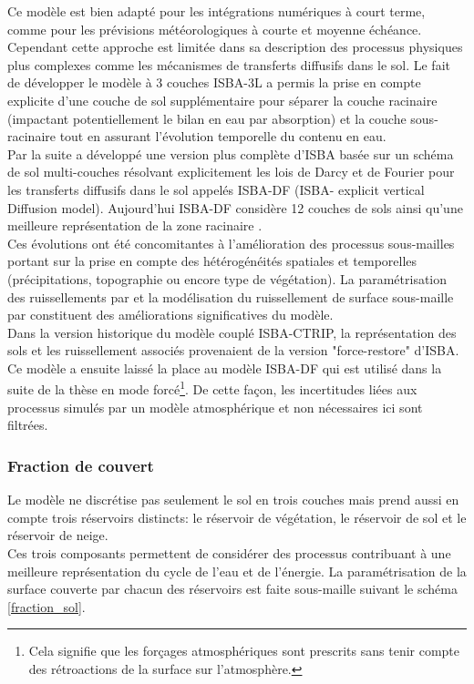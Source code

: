 Ce modèle est bien adapté pour les intégrations numériques à court terme, comme pour les prévisions météorologiques à courte et moyenne échéance. \noindent
Cependant cette approche est limitée dans sa description des processus physiques plus complexes comme les mécanismes de transferts diffusifs dans le sol. Le fait de développer le modèle à 3 couches ISBA-3L a permis la prise en compte explicite d'une couche de sol supplémentaire pour séparer la couche racinaire (impactant potentiellement le bilan en eau par absorption) et la couche sous-racinaire \citep{boone1999} tout en assurant l'évolution temporelle du contenu en eau.\\

Par la suite \citet{boone2000} a développé une version plus complète d'ISBA basée sur un schéma de sol multi-couches résolvant explicitement les lois de Darcy et de Fourier pour les transferts diffusifs dans le sol appelés ISBA-DF (ISBA- explicit vertical Diffusion model).
Aujourd'hui ISBA-DF considère 12 couches de sols ainsi qu'une meilleure représentation de la zone racinaire \citep{decharme2011}.\\
\noindent Ces évolutions ont été concomitantes à l'amélioration des processus sous-mailles portant sur la prise en compte des hétérogénéités spatiales et temporelles (précipitations, topographie ou encore type de végétation). La paramétrisation des ruissellements par \citet{decharme2006} et la modélisation du ruissellement de surface sous-maille par \citet{habets1999} constituent des améliorations significatives du modèle.\\

\noindent Dans la version historique du modèle couplé ISBA-CTRIP, la représentation des sols et les ruissellement associés provenaient de la version "force-restore" d'ISBA. Ce modèle a ensuite laissé la place au modèle ISBA-DF qui est utilisé dans la suite de la thèse en mode forcé\footnote{Cela signifie que les forçages atmosphériques sont prescrits sans tenir compte des rétroactions de la surface sur l'atmosphère.}. De cette façon, les incertitudes liées aux processus simulés par un modèle atmosphérique et non nécessaires ici sont filtrées.

\subsubsection*{{\selectfont Fraction de couvert}}
Le modèle ne discrétise pas seulement le sol en trois couches mais prend aussi en compte trois réservoirs distincts: le réservoir de végétation, le réservoir de sol et le réservoir de neige. \\
Ces trois composants permettent de considérer des processus contribuant à une meilleure représentation du cycle de l'eau et de l'énergie. La paramétrisation de la surface couverte par chacun des réservoirs est faite sous-maille suivant le schéma \ref{fraction_sol}.

